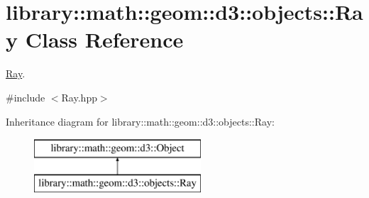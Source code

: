 \hypertarget{classlibrary_1_1math_1_1geom_1_1d3_1_1objects_1_1_ray}{}\section{library\+:\+:math\+:\+:geom\+:\+:d3\+:\+:objects\+:\+:Ray Class Reference}
\label{classlibrary_1_1math_1_1geom_1_1d3_1_1objects_1_1_ray}


\hyperlink{classlibrary_1_1math_1_1geom_1_1d3_1_1objects_1_1_ray}{Ray}.  




{\ttfamily \#include $<$Ray.\+hpp$>$}

Inheritance diagram for library\+:\+:math\+:\+:geom\+:\+:d3\+:\+:objects\+:\+:Ray\+:\begin{figure}[H]
\begin{center}
\leavevmode
\includegraphics[height=2.000000cm]{classlibrary_1_1math_1_1geom_1_1d3_1_1objects_1_1_ray}
\end{center}
\end{figure}

